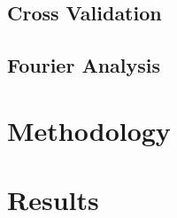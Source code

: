 \documentclass[10pt]{article}
\begin{document}
\subsection{Cross Validation}

% 

\subsection{Fourier Analysis}



\section{Methodology}



\section{Results}

\end{document}
